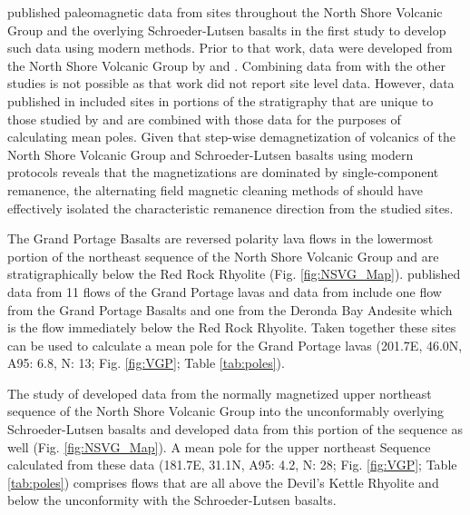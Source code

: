 \documentclass[11pt,letterpaper]{article}
\begin{document}
\cite{Tauxe2009a} published paleomagnetic data from sites throughout the North Shore Volcanic Group and the overlying Schroeder-Lutsen basalts in the first study to develop such data using modern methods. Prior to that work, data were developed from the North Shore Volcanic Group by \citet{Books1968a,Books1972a} and \citet{Palmer1970a}. Combining data from \citet{Palmer1970a} with the other studies is not possible as that work did not report site level data. However, data published in \cite{Books1968a,Books1972a} included sites in portions of the stratigraphy that are unique to those studied by \cite{Tauxe2009a} and are combined with those data for the purposes of calculating mean poles. Given that step-wise demagnetization of volcanics of the North Shore Volcanic Group and Schroeder-Lutsen basalts using modern protocols reveals that the magnetizations are dominated by single-component remanence, the alternating field magnetic cleaning methods of \cite{Books1968a,Books1972a} should have effectively isolated the characteristic remanence direction from the studied sites.

The Grand Portage Basalts are reversed polarity lava flows in the lowermost portion of the northeast sequence of the North Shore Volcanic Group and are stratigraphically below the Red Rock Rhyolite (Fig. \ref{fig:NSVG_Map}). \cite{Books1968a} published data from 11 flows of the Grand Portage lavas and data from \cite{Tauxe2009a} include one flow from the Grand Portage Basalts and one from the Deronda Bay Andesite which is the flow immediately below the Red Rock Rhyolite. Taken together these sites can be used to calculate a mean pole for the Grand Portage lavas (201.7\textdegree E, 46.0\textdegree N, A95: 6.8\textdegree, N: 13; Fig. \ref{fig:VGP}; Table \ref{tab:poles}).

The study of \cite{Books1972a} developed data from the normally magnetized upper northeast sequence of the North Shore Volcanic Group into the unconformably overlying Schroeder-Lutsen basalts and \cite{Tauxe2009a} developed data from this portion of the sequence as well (Fig. \ref{fig:NSVG_Map}). A mean pole for the upper northeast Sequence calculated from these data (181.7\textdegree E, 31.1\textdegree N, A95: 4.2\textdegree, N: 28; Fig. \ref{fig:VGP}; Table \ref{tab:poles}) comprises flows that are all above the Devil's Kettle Rhyolite and below the unconformity with the Schroeder-Lutsen basalts.
\end{document}
